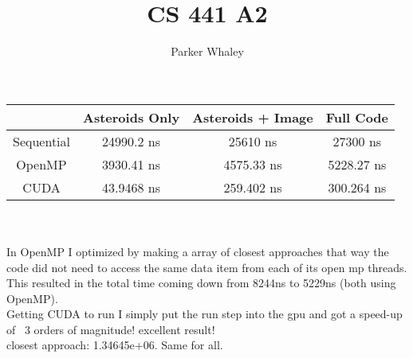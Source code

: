 \documentclass[11pt,a4paper]{article}
\author{Parker Whaley}
\title{CS 441 A2}
\begin{document}
\maketitle
\begin{tabular}{| c | c | c | c |}
\hline
& Asteroids Only & Asteroids + Image & Full Code\\
\hline
Sequential & 24990.2 ns & 25610 ns & 27300 ns\\
\hline
OpenMP & 3930.41 ns & 4575.33 ns & 5228.27 ns\\
\hline
CUDA & 43.9468 ns & 259.402 ns & 300.264 ns\\
\hline


\end{tabular}\\\\

In OpenMP I optimized by making a array of closest approaches that way the code did not need to access the same data item from each of its open mp threads.  This resulted in the total time coming down from 8244ns to 5229ns (both using OpenMP).\\

Getting CUDA to run I simply put the run step into the gpu and got a speed-up of ~3 orders of magnitude!  excellent result!\\


closest approach: 1.34645e+06.  Same for all.
\end{document}
